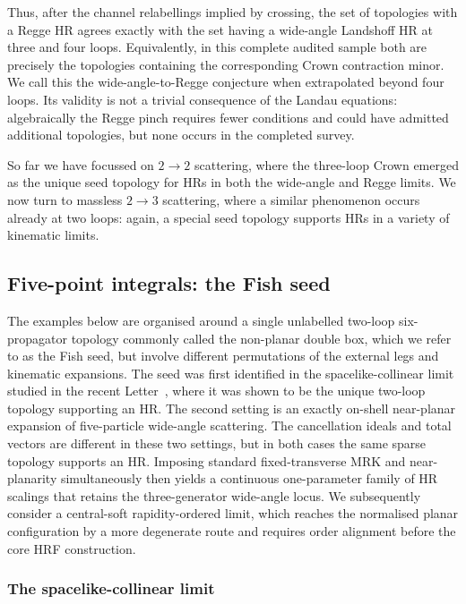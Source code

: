 \documentclass[a4paper,11pt]{article}
\begin{document}
Thus, after the channel relabellings implied by crossing, the set of
topologies with a Regge HR agrees exactly with the set having a wide-angle
Landshoff HR at three and four loops.  Equivalently, in this complete audited
sample both are precisely the topologies containing the corresponding
Crown contraction minor.  We call this the
wide-angle-to-Regge conjecture when
extrapolated beyond four loops.  Its validity is not a trivial consequence
of the Landau equations: algebraically the Regge pinch requires fewer
conditions and could have admitted additional topologies, but none occurs in
the completed survey.

So far we have focussed on $2\to2$ scattering, where the three-loop Crown
emerged as the unique seed topology for HRs in both the wide-angle and Regge
limits. We now turn to massless $2\to3$ scattering, where a similar phenomenon
occurs already at two loops: again, a special seed topology supports HRs in a
variety of kinematic limits.

\subsection{Five-point integrals: the Fish seed}
\label{sec:example-five-point}

The examples below are organised around a single unlabelled two-loop
six-propagator topology commonly called the non-planar double box, which we
refer to as the Fish seed, but involve different permutations of the external
legs and kinematic expansions. The seed was first identified
in the spacelike-collinear limit studied in the recent
Letter~\cite{Chen:2026dnj}, where it was shown to be the unique two-loop
topology supporting an HR. The second setting is an exactly on-shell
near-planar expansion of five-particle wide-angle scattering. The cancellation
ideals and total vectors are different in these two settings, but in both cases
the same sparse topology supports an HR.  Imposing standard fixed-transverse
MRK and near-planarity simultaneously then yields a continuous one-parameter
family of HR scalings that retains the three-generator wide-angle locus.  We
subsequently consider a central-soft rapidity-ordered limit, which reaches the
normalised planar configuration by a more degenerate route and requires order
alignment before the core HRF construction.

\subsubsection{The spacelike-collinear limit}
\label{sec:five-point-spacelike-collinear}
\end{document}
